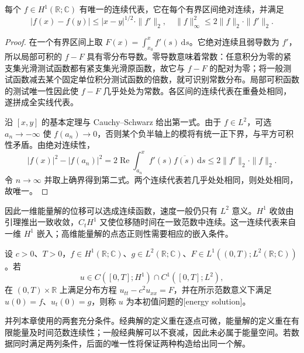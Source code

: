 \begin{lemma}[一维位移的连续代表]\label{b2:lem:09-h1-representative}
每个 \(f\in H^1(\mathbb R;\mathbb C)\) 有唯一的连续代表，它在每个有界区间绝对连续，并满足
\[
 |f(x)-f(y)|\leq|x-y|^{1/2}\cdot\|f'\|_2,
 \quad\|f\|_\infty^2\leq2\|f\|_2\cdot\|f'\|_2.
\]
\end{lemma}
\begin{proof}
在一个有界区间上取 \(F(x)=\int_{x_0}^xf'(s)\,\mathrm{d}s\)。它绝对连续且弱导数为 \(f'\)，所以局部可积的 \(f-F\) 具有零分布导数。零导数意味着常数：任意积分为零的紧支集光滑测试函数都有紧支集光滑原函数，故它与 \(f-F\) 的配对为零；将一般测试函数减去某个固定单位积分测试函数的倍数，就可识别常数分布。局部可积函数的测试唯一性因此使 \(f-F\) 几乎处处为常数。各区间的连续代表在重叠处相同，遂拼成全实线代表。

沿 \([x,y]\) 的基本定理与 Cauchy--Schwarz 给出第一式。由于 \(f\in L^2\)，可选 \(a_n\to-\infty\) 使 \(f(a_n)\to0\)，否则某个负半轴上的模将有统一正下界，与平方可积性矛盾。由绝对连续性，
\[
 |f(x)|^2-|f(a_n)|^2
 =2\operatorname{Re}\int_{a_n}^xf'(s)\overline{f(s)}\,\mathrm{d}s
 \leq2\|f'\|_2\cdot\|f\|_2.
\]
令 \(n\to\infty\) 并取上确界得到第二式。两个连续代表若几乎处处相同，则处处相同，故唯一。
\end{proof}

因此一维能量解的位移可以选成连续函数，速度一般仍只有 \(L^2\) 意义。\(H^1\) 收敛由引理推出一致收敛，\(C_tH^1\) 又使位移随时间在一致范数中连续。这一连续代表来自一维 \(H^1\) 嵌入；高维能量解的点态正则性需要相应的嵌入条件。

\begin{definition}\label{b2:def:09-energy-solution}
设 \(c>0\)、\(T>0\)，\(f\in H^1(\mathbb R;\mathbb C)\)、\(g\in L^2(\mathbb R;\mathbb C)\)、\(F\in L^1((0,T);L^2(\mathbb R;\mathbb C))\)。若
\[
 u\in C([0,T];H^1)\cap C^1([0,T];L^2),
\]
在 \((0,T)\times\mathbb R\) 上满足分布方程 \(u_{tt}-c^2u_{xx}=F\)，并在所示范数意义下满足 \(u(0)=f\)、\(u_t(0)=g\)，则称 \(u\) 为本初值问题的[energy solution]。
\end{definition}

并列本章使用的两套充分条件。经典解的定义重在逐点可微，能量解的定义重在有限能量及时间范数连续性；一般经典解可以不衰减，因此未必属于能量空间。若数据同时满足两列条件，后面的唯一性将保证两种构造给出同一个解。

